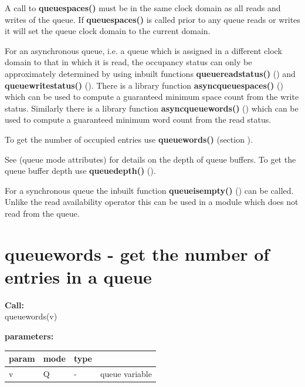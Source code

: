         A call to {\bf queuespaces()} must be in the same clock domain as all
        reads and writes of the queue. If {\bf queuespaces()} is called prior to
        any queue reads or writes it will set the queue clock domain to the
        current domain.

        For an asynchronous queue, i.e. a queue which is assigned in a different
        clock domain to that in which it is read, the occupancy status can
        only be approximately determined by using inbuilt functions {\bf
        queuereadstatus()} () and {\bf
        queuewritestatus()} ().
        There is a library function {\bf asyncqueuespaces()}
        () which can be used to compute
        a guaranteed minimum space count from the write status.
        Similarly there is a library function {\bf asyncqueuewords()}
        () which can be used to compute
        a guaranteed minimum word count from the read status.

        To get the number of occupied entries use {\bf queuewords()} (section
        ).
        
        See  (queue mode
        attributes) for details on the depth of queue buffers. To get the queue
        buffer depth use {\bf queuedepth()} ().
        
        For a synchronous queue the inbuilt function {\bf queueisempty()}
        () can be called. Unlike the read
        availability operator this can be used in a module which does not
        read from the queue.
      
 

    \section{queuewords - get the number of entries in a queue}\label{sec:ifqueuewords}
        
        {\bf Call:} \\
        queuewords(v)
        
        {\bf parameters:} \\
        \begin{tabular}{| l | l | l | l |}
        \hline
        param  & mode & type & \\
        \hline \hline
        v & Q & - & queue variable \\ \hline
        \end{tabular}
        
